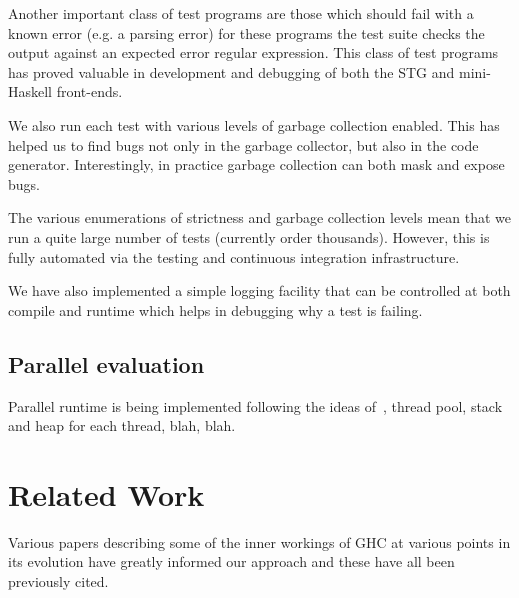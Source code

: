 \documentclass{llncs}
\begin{document}
Another important class of test programs are those which should fail with a
known error (e.g. a parsing error) for these programs the test suite checks
the output against an expected error regular expression. This class of test
programs has proved valuable in development and debugging of both the STG
and mini-Haskell front-ends.

We also run each test with various levels of garbage collection enabled. This
has helped us to find bugs not only in the garbage collector, but also in the
code generator.  Interestingly, in practice garbage collection can both mask
and expose bugs.

The various enumerations of strictness and garbage collection levels mean that
we run a quite large number of tests (currently order thousands). However,
this is fully automated via the testing and continuous integration
infrastructure.

We have also implemented a simple logging facility that can be controlled at 
both compile and runtime which helps in debugging why a test is failing.

\subsection{Parallel evaluation}

Parallel runtime is being implemented following the ideas
of~\cite{Harris:2005,Marlow:2008,Marlow:2009}, thread pool, stack and heap 
for each thread, blah, blah.

\section{Related Work}

Various papers describing some of the inner workings of GHC at various points
in its evolution have greatly informed our approach and these have all been
previously cited.
\end{document}
